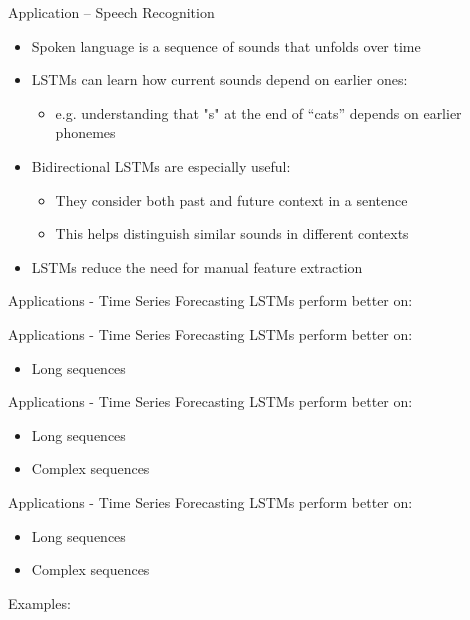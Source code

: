 \documentclass[10pt, aspectratio=169]{beamer}
\begin{document}
\begin{frame}[t]{Application – Speech Recognition}
\begin{itemize}
  \item Spoken language is a sequence of sounds that unfolds over time
  \pause
  \item LSTMs can learn how current sounds depend on earlier ones:
    \begin{itemize}
      \item e.g. understanding that "s" at the end of “cats” depends on earlier phonemes
    \end{itemize}
  \pause
  \item Bidirectional LSTMs are especially useful:
    \begin{itemize}
      \item They consider both past and future context in a sentence
      \item This helps distinguish similar sounds in different contexts
    \end{itemize}
  \pause
  \item LSTMs reduce the need for manual feature extraction
\end{itemize}
\end{frame}

\begin{frame}[t]{Applications - Time Series Forecasting}
LSTMs perform better on:
\end{frame}

\begin{frame}[t]{Applications - Time Series Forecasting}
LSTMs perform better on:
\begin{itemize}
    \item Long sequences
\end{itemize}
\end{frame}

\begin{frame}[t]{Applications - Time Series Forecasting}
LSTMs perform better on:
\begin{itemize}
    \item Long sequences
    \item Complex sequences
\end{itemize}
\end{frame}

\begin{frame}[t]{Applications - Time Series Forecasting}
LSTMs perform better on:
\begin{itemize}
    \item Long sequences
    \item Complex sequences
\end{itemize}
Examples:
\end{frame}
\end{document}
